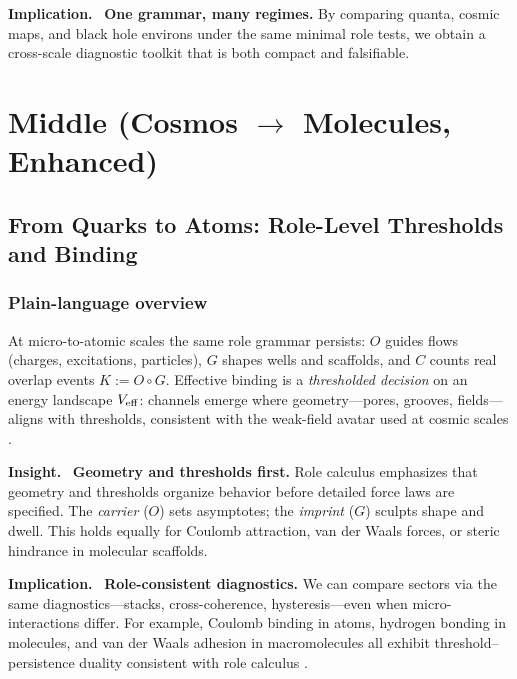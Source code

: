 \documentclass[12pt,a4paper,oneside]{scrreprt}
\newenvironment{insight}{\par\vspace{0.5em}\noindent\textbf{Insight.}\ }{\par\vspace{0.5em}}
\newenvironment{implication}{\par\vspace{0.5em}\noindent\textbf{Implication.}\ }{\par\vspace{0.5em}}
\begin{document}
\begin{implication}
\textbf{One grammar, many regimes.} 
By comparing quanta, cosmic maps, and black hole environs 
under the same minimal role tests, we obtain a cross-scale 
diagnostic toolkit that is both compact and falsifiable.
\end{implication}

\part{Middle (Cosmos $\rightarrow$ Molecules, Enhanced)}

\chapter{From Quarks to Atoms: Role-Level Thresholds and Binding}\label{ch:micro-binding}

\section*{Plain-language overview}

At micro-to-atomic scales the same role grammar persists: 
$O$ guides flows (charges, excitations, particles), 
$G$ shapes wells and scaffolds, 
and $C$ counts real overlap events $K := O \!\circ G$. 
Effective binding is a \emph{thresholded decision} on an energy landscape 
$V_{\rm eff}$: channels emerge where geometry---pores, grooves, fields---aligns 
with thresholds, consistent with the weak-field avatar used at cosmic scales 
\citep{Atkins2018PhysChem}. 

\begin{insight}
\textbf{Geometry and thresholds first.} 
Role calculus emphasizes that geometry and thresholds organize 
behavior before detailed force laws are specified. 
The \emph{carrier} ($O$) sets asymptotes; 
the \emph{imprint} ($G$) sculpts shape and dwell. 
This holds equally for Coulomb attraction, van der Waals forces, 
or steric hindrance in molecular scaffolds.
\end{insight}

\begin{implication}
\textbf{Role-consistent diagnostics.} 
We can compare sectors via the same diagnostics---stacks, 
cross-coherence, hysteresis---even when micro-interactions differ. 
For example, Coulomb binding in atoms, hydrogen bonding in molecules, 
and van der Waals adhesion in macromolecules all exhibit 
threshold–persistence duality consistent with role calculus 
\citep{Israelachvili2011Intermolecular}.
\end{implication}
\end{document}
